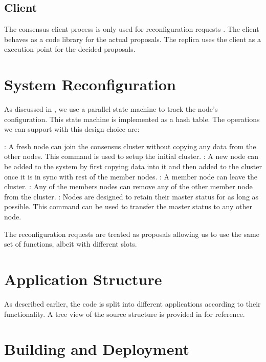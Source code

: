 \subsection{Client}

The consensus client process is only used for reconfiguration requests
. The client behaves as a code library for the actual
proposals. The replica uses the client as a execution point for the decided
proposals.

\section{System Reconfiguration}
\label{section:impl.rcfg}

As discussed in , we use a parallel state machine
to track the node's configuration. This state machine is implemented as a
hash table. The operations we can support with this design choice are:

\begin{itemize}
    : A fresh node can join the consensus cluster without copying
    any data from the other nodes. This command is used to setup the initial
    cluster.
    : A new node can be added to the system by first
    copying data into it and then added to the cluster once it is in sync with
    rest of the member nodes.
    : A member node can leave the cluster.
    : Any of the members nodes can remove any of the other member
    node from the cluster.
    : Nodes are designed to retain their master status
    for as long as possible. This command can be used to transfer the master
    status to any other node.
\end{itemize}

The reconfiguration requests are treated as proposals allowing us to use the
same set of functions, albeit with different slots.

\section{Application Structure}

As described earlier, the code is split into different applications according
to their functionality. A tree view of the source structure is provided in
 for reference.

\section{Building and Deployment}

